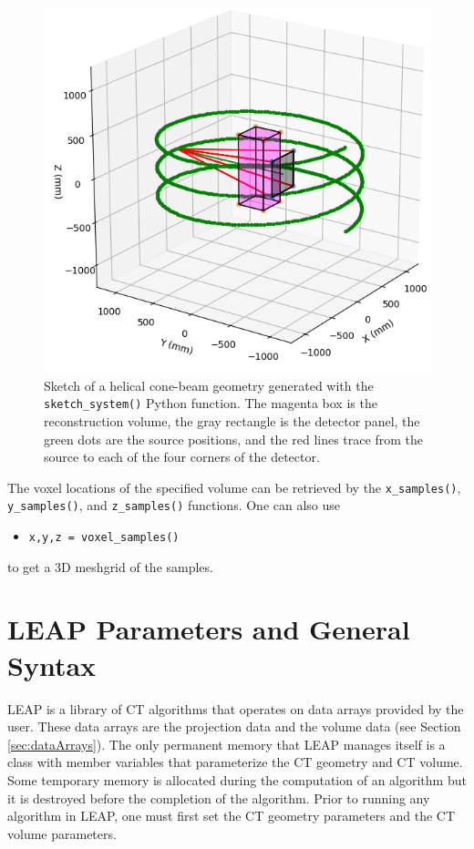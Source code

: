 \documentclass[11pt]{article}
\begin{document}
\begin{figure}[h!]
\begin{center}
\includegraphics[scale=0.5]{helical}
\end{center}
\vspace{-20pt}\caption{Sketch of a helical cone-beam geometry generated with the \texttt{sketch\_system()} Python function.  The  magenta box is the reconstruction volume, the gray rectangle is the detector panel, the green dots are the source positions, and the red lines trace from the source to each of the four corners of the detector.} \label{fig:helicalSketch}
\end{figure}

The voxel locations of the specified volume can be retrieved by the \texttt{x\_samples()}, \texttt{y\_samples()}, and \texttt{z\_samples()} functions.  One can also use
\begin{itemize}
    \item[] \texttt{x,y,z = voxel\_samples()}
\end{itemize}
to get a 3D meshgrid of the samples.

\section{LEAP Parameters and General Syntax}

LEAP is a library of CT algorithms that operates on data arrays provided by the user.  These data arrays are the projection data and the volume data (see Section \ref{sec:dataArrays}).  The only permanent memory that LEAP manages itself is a class with member variables that parameterize the CT geometry and CT volume.  Some temporary memory is allocated during the computation of an algorithm but it is destroyed before the completion of the algorithm.  Prior to running any algorithm in LEAP, one must first set the CT geometry parameters and the CT volume parameters.
\end{document}
